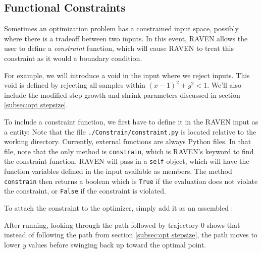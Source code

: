 
\subsection{Functional Constraints} \label{subsec:opt explicit constraint}
Sometimes an optimization problem has a constrained input space, possibly where there is a tradeoff between
two inputs.  In this event, RAVEN allows the user to define a \emph{constraint} function, which will cause
RAVEN to treat this constraint as it would a boundary condition.

For example, we will introduce a void in the input where we reject inputs.  This void is defined by rejecting
all samples within $(x-1)^2 + y^2 < 1$.  We'll also include the modified step growth and shrink parameters
discussed in section \ref{subsec:opt stepsize}.

To include a constraint function, we first have to define it in the RAVEN input as a 
entity:
Note that the file \texttt{./Constrain/constraint.py} is located relative to the working directory.  Currently,
external functions are always Python files.  In that file,
note that the only method is \texttt{constrain}, which is RAVEN's keyword to find the constraint function.
RAVEN will pass in a \texttt{self} object, which will have the function variables defined in the
 input available as members.  The method \texttt{constrain} then returns a boolean which is \texttt{True} if
the evaluation does not violate the constraint, or \texttt{False} if the constraint is violated.

To attach the constraint to the optimizer, simply add it as an assembled :

After running, looking through the path followed by trajectory 0 shows that instead of following the path from
section \ref{subsec:opt stepsize}, the path moves to lower \emph{y} values before swinging back up toward the
optimal point.

